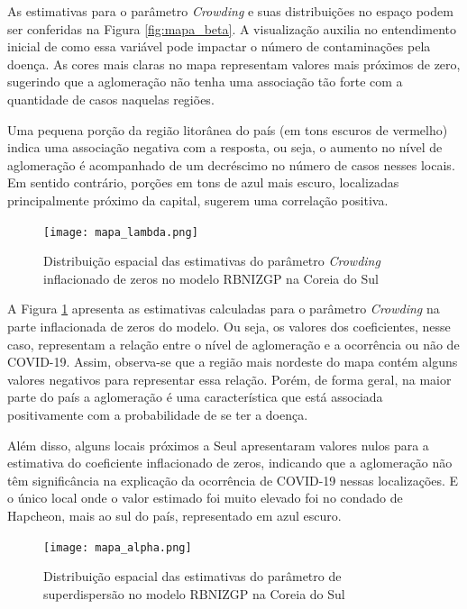 \documentclass[12pt, a4paper, twoside]{report}
\numberwithin{equation}{section} %
\begin{document}
As estimativas para o parâmetro \textit{Crowding} e suas distribuições no espaço podem ser conferidas na Figura \ref{fig:mapa_beta}. A visualização auxilia no entendimento inicial de como essa variável pode impactar o número de contaminações pela doença. As cores mais claras no mapa representam valores mais próximos de zero, sugerindo que a aglomeração não tenha uma associação tão forte com a quantidade de casos naquelas regiões.

Uma pequena porção da região litorânea do país (em tons escuros de vermelho) indica uma associação negativa com a resposta, ou seja, o aumento no nível de aglomeração é acompanhado de um decréscimo no número de casos nesses locais. Em sentido contrário, porções em tons de azul mais escuro, localizadas principalmente próximo da capital, sugerem uma correlação positiva.


\begin{figure}[!htb]
    \centering
    \texttt{[image: mapa\_lambda.png]}
    \caption{Distribuição espacial das estimativas do parâmetro \textit{Crowding} inflacionado de zeros no modelo RBNIZGP na Coreia do Sul}
\label{fig:mapa_lambda}
\end{figure}

A Figura \ref{fig:mapa_lambda} apresenta as estimativas calculadas para o parâmetro \textit{Crowding} na parte inflacionada de zeros do modelo. Ou seja, os valores dos coeficientes, nesse caso, representam a relação entre o nível de aglomeração e a ocorrência ou não de COVID-19. Assim, observa-se que a região mais nordeste do mapa contém alguns valores negativos para representar essa relação. Porém, de forma geral, na maior parte do país a aglomeração é uma característica que está associada positivamente com a probabilidade de se ter a doença.

Além disso, alguns locais próximos a Seul apresentaram valores nulos para a estimativa do coeficiente inflacionado de zeros, indicando que a aglomeração não têm significância na explicação da ocorrência de COVID-19 nessas localizações. E o único local onde o valor estimado foi muito elevado foi no condado de Hapcheon, mais ao sul do país, representado em azul escuro.

\begin{figure}[!htb]
    \centering
    \texttt{[image: mapa\_alpha.png]}
    \caption{Distribuição espacial das estimativas do parâmetro de superdispersão no modelo RBNIZGP na Coreia do Sul}
\label{fig:mapa_alpha}
\end{figure}
\end{document}
